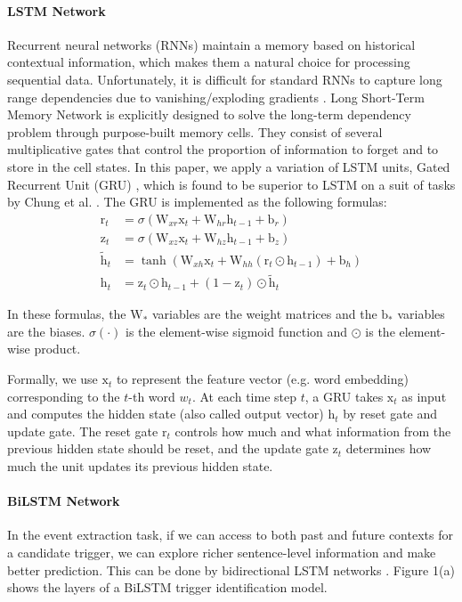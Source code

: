 \paragraph{LSTM Network}
Recurrent neural networks (RNNs) maintain a memory based on historical contextual information, which makes them a natural choice for processing sequential data. Unfortunately, it is difficult for standard RNNs to capture long range dependencies due to vanishing/exploding gradients \cite{bengio1994learning}. Long Short-Term Memory Network \cite{hochreiter1997long} is explicitly designed to solve the long-term dependency problem through purpose-built memory cells. They consist of several multiplicative gates that control the proportion of information to forget and to store in the cell states. In this paper, we apply a variation of LSTM units, Gated Recurrent Unit (GRU) \cite{cho2014learning}, which is found to be superior to LSTM on a suit of tasks by Chung et al. . The GRU is implemented as the following formulas:
\begin{align*}
	\text{r}_t &= \sigma(\text{W}_{xr}\text{x}_t + \text{W}_{hr}\text{h}_{t-1} + \text{b}_r) \\
	\text{z}_t &= \sigma(\text{W}_{xz}\text{x}_t + \text{W}_{hz}\text{h}_{t-1} + \text{b}_z) \\
	\tilde{\text{h}}_t &= \tanh(\text{W}_{xh}\text{x}_t + \text{W}_{hh}(\text{r}_t \odot \text{h}_{t-1}) + \text{b}_h) \\
	\text{h}_t &= \text{z}_t \odot \text{h}_{t-1} + (1 - \text{z}_t) \odot \tilde{\text{h}}_t
\end{align*}

In these formulas, the $\text{W}_*$ variables are the weight matrices and the $\text{b}_*$ variables  are the biases. $\sigma(\cdot)$ is the element-wise sigmoid function and $\odot$ is the element-wise product.

Formally, we use $\text{x}_t$ to represent the feature vector (e.g. word embedding) corresponding to the $t$-th word $w_t$. At each time step $t$, a GRU takes $\text{x}_t$ as input and computes the hidden state (also called output vector) $\text{h}_t$ by reset gate and update gate. The reset gate $\text{r}_t$ controls how much and what information from the previous hidden state should be reset, and the update gate $\text{z}_t$ determines how much the unit updates its previous hidden state.

\paragraph{BiLSTM Network}
In the event extraction task, if we can access to both past and future contexts for a candidate trigger, we can explore richer sentence-level information and make better prediction. This can be done by bidirectional LSTM networks \cite{graves2005framewise,graves2013speech}. Figure 1(a) shows the layers of a BiLSTM trigger identification model.

